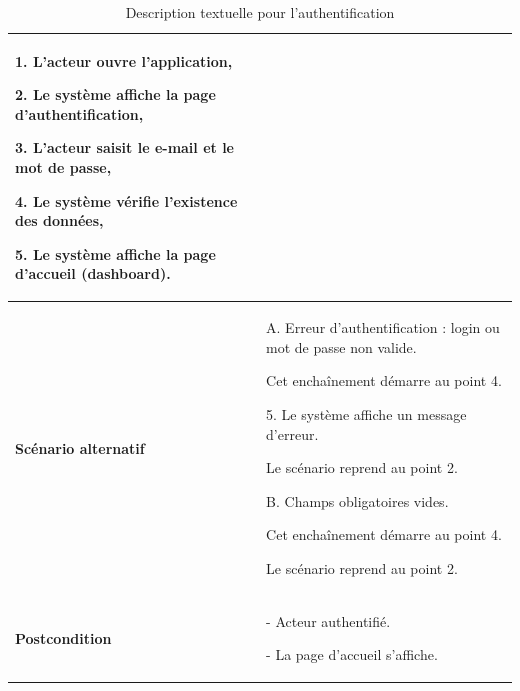 \documentclass[a4paper, 12pt]{report}
\begin{document}
\begin{itemize}
\begin{table}[H]
\begin{tabular}{|p{4cm}|p{8cm}|}
1. L’acteur ouvre l’application,


2. Le système affiche la page d’authentification,


3. L’acteur saisit le e-mail et le mot de passe,


4. Le système vérifie l’existence des données,


5. Le système affiche la page d’accueil (dashboard).
\tabularnewline
\hline
\raggedright \textbf{Scénario alternatif} &  
A. Erreur d’authentification : login ou mot de passe non valide.


Cet enchaînement démarre au point 4.


5. Le système affiche un message d’erreur.


Le scénario reprend au point 2.


B. Champs obligatoires vides.


Cet enchaînement démarre au point 4.


Le scénario reprend au point 2.
\tabularnewline
\hline
\raggedright \textbf{Postcondition} &  
- Acteur authentifié.


- La page d’accueil s’affiche. \tabularnewline
\hline
\end{tabular}
\caption{Description textuelle pour l'authentification}
\end{table}
\end{itemize}
\end{document}
